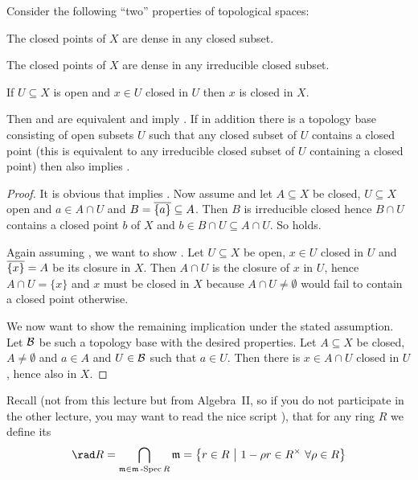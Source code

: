 \documentclass[a4paper,parskip=half,numbers=enddot, DIV=12]{scrreprt}
\begin{document}
\begin{fact}
    Consider the following ``two'' properties of topological spaces:
    \begin{alphanumerate}
    \item 
        The closed points of $X$ are dense in any closed subset.
    \item 
        The closed points of $X$ are dense in any irreducible closed subset.
    \item   
        If $U\subseteq X$ is open and $x\in U$ closed in $U$ then $x$ is closed in $X$.
    \end{alphanumerate}
    Then  and  are equivalent and imply . If in addition there is a topology base consisting of open subsets $U$ such that any closed subset of $U$ contains a closed point (this is equivalent to any irreducible closed subset of $U$ containing a closed point) then  also implies .
\end{fact}
\begin{proof}
    It is obvious that  implies . Now assume  and let $A\subseteq X$ be closed, $U\subseteq X$ open and $a\in A\cap U$ and $B= \overline{\{a\}} \subseteq A$. Then $B$ is irreducible closed hence $B\cap U$ contains a closed point $b$ of $X$ and $b\in B\cap U\subseteq A\cap U$. So  holds.
    
    Again assuming , we want to show . Let $U\subseteq X$ be open, $x\in U$ closed in $U$ and $\overline{\{x\}}= A$ be its closure in $X$. Then $A\cap U$ is the closure of $x$ in $U$, hence $A\cap U = \{x\}$ and $x$ must be closed in $X$ because $A\cap U\neq \emptyset$ would fail to contain a closed point otherwise.
    
    We now want to show the remaining implication under the stated assumption. Let $\mathcal{B}$ be such a topology base with the desired properties. Let $A\subseteq X$ be closed, $A\neq \emptyset $ and $a\in A$ and $U\in \mathcal{B}$ such that $a\in U$. Then there is $x\in A\cap U$ closed in $U$, hence also in $X$. 
\end{proof}

Recall (not from this lecture but from Algebra~II, so if you do not participate in the other lecture, you may want to read the nice script \cite{alg2}), that for any ring $R$ we define its  
\begin{align*}
    \rad R = \bigcap_{\mm\in\mSpec R} \mm = \left\{r\in R\st 1-\rho r \in R^\times\ \forall \rho\in R\right\}
\end{align*}
\end{document}
